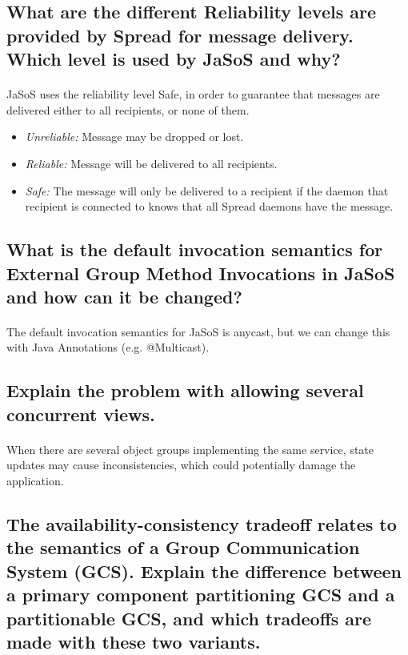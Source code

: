 \documentclass[a4paper,11pt]{article}
\begin{document}
\subsection{
What are the different Reliability levels are provided by Spread for message delivery. Which level is used by
JaSoS and why?
}
\paragraph{}
JaSoS uses the reliability level Safe, in order to guarantee that messages are delivered either to all recipients, or none of them.
\begin{itemize}
	\item \textit{Unreliable:} Message may be dropped or lost.
	\item \textit{Reliable:} Message will be delivered to all recipients.
	\item \textit{Safe:} The message will only be delivered to a recipient if the daemon that recipient is connected to knows that all Spread daemons have the message.
\end{itemize}

\subsection{
What is the default invocation semantics for External Group Method Invocations in JaSoS and how can it be
changed?
}
\paragraph{}
The default invocation semantics for JaSoS is anycast, but we can change this with Java Annotations (e.g. @Multicast).

\subsection{
Explain the problem with allowing several concurrent views.
}
\paragraph{}
When there are several object groups implementing the same service, state updates may cause inconsistencies, which could potentially damage the application.

\subsection{
The availability-consistency tradeoff relates to the semantics of a Group Communication System (GCS). Explain
the difference between a primary component partitioning GCS and a partitionable GCS, and which tradeoffs
are made with these two variants.
}
\end{document}
